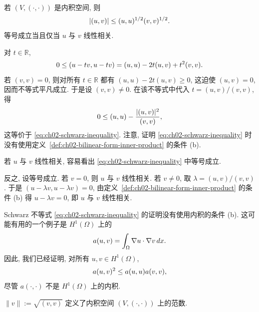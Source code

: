 \begin{Theorem}
\label{thm:ch02-schwarz-inequality}
若 $(V,(\cdot,\cdot))$ 是内积空间, 则
\setcounter{equation}{4}
\begin{equation}
\MathBookFormulaID{formula-ch02-schwarz-inequality}
|(u,v)|\leq (u,u)^{1/2}(v,v)^{1/2}.
\label{eq:ch02-schwarz-inequality}
\end{equation}
等号成立当且仅当 $u$ 与 $v$ 线性相关.
\end{Theorem}

\begin{Proof}
对 $t\in\mathbb R$,
\begin{equation}
\MathBookFormulaID{formula-ch02-schwarz-quadratic}
0\leq(u-tv,u-tv)=(u,u)-2t(u,v)+t^2(v,v).
\label{eq:ch02-schwarz-quadratic}
\end{equation}
若 $(v,v)=0$, 则对所有 $t\in\mathbb R$ 都有 $(u,u)-2t(u,v)\geq0$, 这迫使 $(u,v)=0$, 因而不等式平凡成立. 于是设 $(v,v)\neq0$. 在该不等式中代入 $t=(u,v)/(v,v)$, 得
\begin{equation}
\MathBookFormulaID{formula-ch02-schwarz-minimum}
0\leq(u,u)-\frac{|(u,v)|^2}{(v,v)},
\label{eq:ch02-schwarz-minimum}
\end{equation}
这等价于 \eqref{eq:ch02-schwarz-inequality}. 注意, 证明 \eqref{eq:ch02-schwarz-inequality} 时没有使用定义~\ref{def:ch02-bilinear-form-inner-product} 的条件 (b).

若 $u$ 与 $v$ 线性相关, 容易看出 \eqref{eq:ch02-schwarz-inequality} 中等号成立.

反之, 设等号成立. 若 $v=0$, 则 $u$ 与 $v$ 线性相关. 若 $v\neq0$, 取 $\lambda=(u,v)/(v,v)$. 于是 $(u-\lambda v,u-\lambda v)=0$, 由定义~\ref{def:ch02-bilinear-form-inner-product} 的条件 (b) 得 $u-\lambda v=0$, 即 $u$ 与 $v$ 线性相关.
\end{Proof}

\setcounter{thmcount}{7}
\begin{Remark}
\label{rem:ch02-schwarz-seminorm}
Schwarz 不等式 \eqref{eq:ch02-schwarz-inequality} 的证明没有使用内积的条件 (b). 这可能有用的一个例子是 $H^1(\Omega)$ 上的
\[
\MathBookFormulaID{formula-ch02-gradient-bilinear-form}
a(u,v)=\int_\Omega\nabla u\cdot\nabla v\,dx.
\]
因此, 我们已经证明, 对所有 $u,v\in H^1(\Omega)$,
\[
\MathBookFormulaID{formula-ch02-gradient-schwarz}
a(u,v)^2\leq a(u,u)a(v,v),
\]
尽管 $a(\cdot,\cdot)$ 不是 $H^1(\Omega)$ 上的内积.
\end{Remark}

\setcounter{thmcount}{8}
\begin{Proposition}
\label{prop:ch02-inner-product-norm}
$\|v\|:=\sqrt{(v,v)}$ 定义了内积空间 $(V,(\cdot,\cdot))$ 上的范数.
\end{Proposition}

